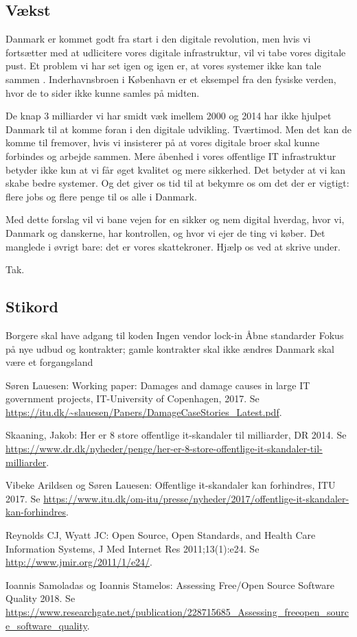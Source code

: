 \documentclass[fleqn]{article}
\begin{document}
\subsection{Vækst}
Danmark er kommet godt fra start i den digitale revolution, men hvis vi fortsætter
med at udlicitere vores digitale infrastruktur, vil vi tabe vores digitale pust.
Et problem vi har set igen og igen er, at vores systemer ikke kan tale sammen
\cite{ITU, Lauesen}. Inderhavnsbroen i København er et eksempel fra den
fysiske verden, hvor de to sider ikke kunne samles på midten.

De knap 3 milliarder vi har smidt væk imellem 2000 og 2014 har ikke hjulpet Danmark til
at komme foran i den digitale udvikling. Tværtimod. Men det kan de komme til fremover, hvis vi
insisterer på at vores digitale broer skal kunne forbindes og arbejde sammen.
Mere åbenhed i vores offentlige IT infrastruktur betyder ikke kun at vi får øget
kvalitet og mere sikkerhed. Det betyder at vi kan skabe bedre systemer. Og det giver os tid
til at bekymre os om det der er vigtigt: flere jobs og flere penge til os alle i Danmark.

\vskip10pt
Med dette forslag vil vi bane vejen for en sikker og nem digital
hverdag, hvor vi, Danmark og danskerne, har kontrollen, og hvor vi ejer de ting vi køber.
Det manglede i øvrigt bare: det er vores skattekroner.
\vskip5pt
Hjælp os ved at skrive under.

\vskip5pt
Tak.

\subsection{Stikord}
Borgere skal have adgang til koden
Ingen vendor lock-in
Åbne standarder
Fokus på nye udbud og kontrakter; gamle kontrakter skal ikke ændres
Danmark skal være et forgangsland

\begin{thebibliography}{1}

 Søren Lauesen: Working paper: Damages and damage causes in
large IT government projects, IT-University of Copenhagen, 2017. Se
\url{https://itu.dk/~slauesen/Papers/DamageCaseStories_Latest.pdf}.

 Skaaning, Jakob: Her er 8 store offentlige it-skandaler til milliarder, DR
2014. Se
\url{https://www.dr.dk/nyheder/penge/her-er-8-store-offentlige-it-skandaler-til-milliarder}.

 Vibeke Arildsen og Søren Lauesen: Offentlige it-skandaler kan forhindres, ITU 2017.
Se \url{https://www.itu.dk/om-itu/presse/nyheder/2017/offentlige-it-skandaler-kan-forhindres}.

 Reynolds CJ, Wyatt JC: Open Source, Open Standards, and Health Care Information
Systems, J Med Internet Res 2011;13(1):e24. Se \url{http://www.jmir.org/2011/1/e24/}.

 Ioannis Samoladas og Ioannis Stamelos: Assessing Free/Open Source Software
Quality 2018. Se
\url{https://www.researchgate.net/publication/228715685_Assessing_freeopen_source_software_quality}.

\end{thebibliography}
\end{document}
